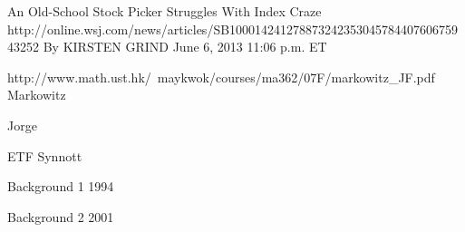 
An Old-School Stock Picker Struggles With Index Craze
http://online.wsj.com/news/articles/SB10001424127887324235304578440760675943252
By KIRSTEN GRIND
June 6, 2013 11:06 p.m. ET


http://www.math.ust.hk/~maykwok/courses/ma362/07F/markowitz_JF.pdf
Markowitz

Jorge


ETF Synnott


Background 1 1994

Background 2 2001



